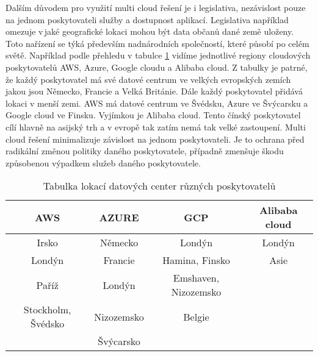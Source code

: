 	Dalším důvodem pro využití multi cloud řešení je i legislativa, nezávislost pouze na jednom poskytovateli služby a dostupnost aplikací. Legislativa například omezuje \linebreak v\,jaké geografické lokaci mohou být data občanů dané země uloženy. Toto nařízení se týká především nadnárodních společností, které působí po celém světě. Například \linebreak podle přehledu v tabulce \ref{table:1} vidíme jednotlivé regiony cloudových poskytovatelů AWS, Azure, Google cloudu a Alibaba cloud. Z tabulky je patrné, že každý poskytovatel má své datové centrum ve velkých evropských zemích jakou jsou Německo, Francie a Velká Británie. Dále každý poskytovatel přidává lokaci v menší zemi. AWS má datové centrum ve Švédsku, Azure ve Švýcarsku a Google cloud ve Finsku. Vyjímkou je Alibaba cloud. Tento čínský poskytovatel cílí hlavně na asijský trh a v evropě tak zatím nemá tak velké zastoupení. Multi cloud řešení minimalizuje závislost na jednom poskytovateli. Je to ochrana před radikální změnou politiky daného poskytovatele, případně zmenšuje škodu způsobenou výpadkem služeb daného poskytovatele.

\begin{table}[h]
\begin{tabular}{c|c|c|c}
\hline
	\textbf{AWS}    & \textbf{AZURE}   & \textbf{GCP}    & \textbf{Alibaba cloud}  \\ \hline
	Irsko  & Německo & Londýn               & Londýn         \\ \hline
	Londýn & Francie & Hamina, Finsko       & Asie           \\ \hline
	Paříž  & Londýn  & Emshaven, Nizozemsko &                \\ \hline
	Stockholm, Švédsko & Nizozemsko & Belgie &               \\ \hline
	       & Švýcarsko &            &       &               
\end{tabular}
\caption{Tabulka lokací datových center různých poskytovatelů}
\label{table:1}
\end{table}
